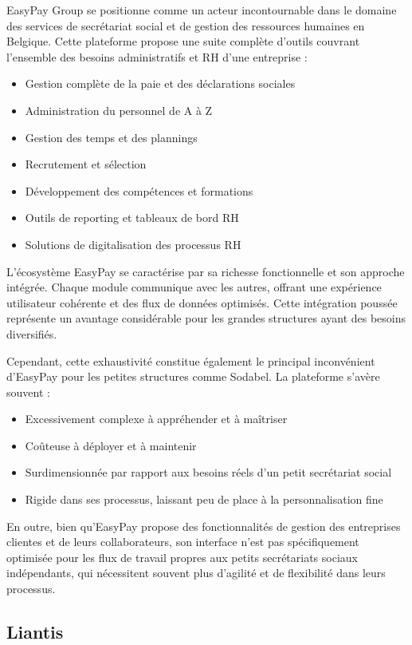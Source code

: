 \documentclass[12pt,a4paper]{report}
\begin{document}
EasyPay Group se positionne comme un acteur incontournable dans le domaine des services de secrétariat social et de gestion des ressources humaines en Belgique. Cette plateforme propose une suite complète d'outils couvrant l'ensemble des besoins administratifs et RH d'une entreprise :

\begin{itemize}
  \item Gestion complète de la paie et des déclarations sociales
  \item Administration du personnel de A à Z
  \item Gestion des temps et des plannings
  \item Recrutement et sélection
  \item Développement des compétences et formations
  \item Outils de reporting et tableaux de bord RH
  \item Solutions de digitalisation des processus RH
\end{itemize}

L'écosystème EasyPay se caractérise par sa richesse fonctionnelle et son approche intégrée. Chaque module communique avec les autres, offrant une expérience utilisateur cohérente et des flux de données optimisés. Cette intégration poussée représente un avantage considérable pour les grandes structures ayant des besoins diversifiés.

Cependant, cette exhaustivité constitue également le principal inconvénient d'EasyPay pour les petites structures comme Sodabel. La plateforme s'avère souvent :
\begin{itemize}
  \item Excessivement complexe à appréhender et à maîtriser
  \item Coûteuse à déployer et à maintenir
  \item Surdimensionnée par rapport aux besoins réels d'un petit secrétariat social
  \item Rigide dans ses processus, laissant peu de place à la personnalisation fine
\end{itemize}

En outre, bien qu'EasyPay propose des fonctionnalités de gestion des entreprises clientes et de leurs collaborateurs, son interface n'est pas spécifiquement optimisée pour les flux de travail propres aux petits secrétariats sociaux indépendants, qui nécessitent souvent plus d'agilité et de flexibilité dans leurs processus.

\subsection{Liantis}
\end{document}
